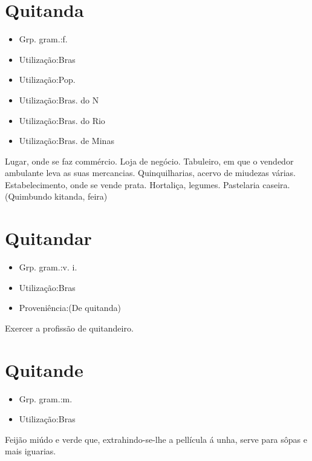 \section{Quitanda}
\begin{itemize}
\item {Grp. gram.:f.}
\end{itemize}
\begin{itemize}
\item {Utilização:Bras}
\end{itemize}
\begin{itemize}
\item {Utilização:Pop.}
\end{itemize}
\begin{itemize}
\item {Utilização:Bras. do N}
\end{itemize}
\begin{itemize}
\item {Utilização:Bras. do Rio}
\end{itemize}
\begin{itemize}
\item {Utilização:Bras. de Minas}
\end{itemize}
Lugar, onde se faz commércio.
Loja de negócio.
Tabuleiro, em que o vendedor ambulante leva as suas mercancias.
Quinquilharias, acervo de miudezas várias.
Estabelecimento, onde se vende prata.
Hortaliça, legumes.
Pastelaria caseira.
(Quimbundo \textunderscore kitanda\textunderscore , feira)
\section{Quitandar}
\begin{itemize}
\item {Grp. gram.:v. i.}
\end{itemize}
\begin{itemize}
\item {Utilização:Bras}
\end{itemize}
\begin{itemize}
\item {Proveniência:(De \textunderscore quitanda\textunderscore )}
\end{itemize}
Exercer a profissão de quitandeiro.
\section{Quitande}
\begin{itemize}
\item {Grp. gram.:m.}
\end{itemize}
\begin{itemize}
\item {Utilização:Bras}
\end{itemize}
Feijão miúdo e verde que, extrahindo-se-lhe a pellícula á unha, serve para sôpas e mais iguarias.
